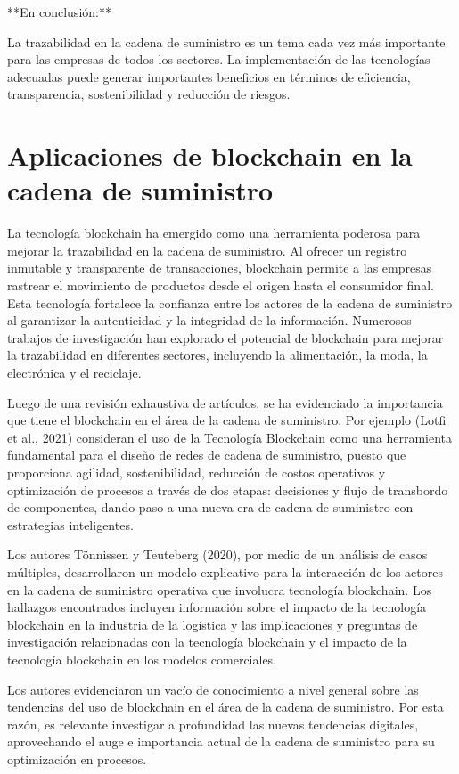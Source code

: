 \documentclass[main.tex]{subfiles}
\begin{document}
**En conclusión:**

La trazabilidad en la cadena de suministro es un tema cada vez más importante para las empresas de todos los sectores. La implementación de las tecnologías adecuadas puede generar importantes beneficios en términos de eficiencia, transparencia, sostenibilidad y reducción de riesgos.

\section{Aplicaciones de blockchain en la cadena de suministro}

La tecnología blockchain ha emergido como una herramienta poderosa para mejorar la trazabilidad en la cadena de suministro. Al ofrecer un registro inmutable y transparente de transacciones, blockchain permite a las empresas rastrear el movimiento de productos desde el origen hasta el consumidor final. Esta tecnología fortalece la confianza entre los actores de la cadena de suministro al garantizar la autenticidad y la integridad de la información. Numerosos trabajos de investigación han explorado el potencial de blockchain para mejorar la trazabilidad en diferentes sectores, incluyendo la alimentación, la moda, la electrónica y el reciclaje.

Luego de una revisión exhaustiva de artículos, se ha evidenciado la importancia que tiene
el blockchain en el área de la cadena de suministro. Por ejemplo (Lotfi et al., 2021) consideran el
uso de la Tecnología Blockchain como una herramienta fundamental para el diseño de redes de
cadena de suministro, puesto que proporciona agilidad, sostenibilidad, reducción de costos
operativos y optimización de procesos a través de dos etapas: decisiones y flujo de transbordo de
componentes, dando paso a una nueva era de cadena de suministro con estrategias inteligentes.

Los autores Tönnissen y Teuteberg (2020), por medio de un análisis de casos múltiples,
desarrollaron un modelo explicativo para la interacción de los actores en la cadena de suministro
operativa que involucra tecnología blockchain. Los hallazgos encontrados incluyen información
sobre el impacto de la tecnología blockchain en la industria de la logística y las implicaciones y
preguntas de investigación relacionadas con la tecnología blockchain y el impacto de la tecnología
blockchain en los modelos comerciales.

Los autores evidenciaron un vacío de conocimiento a nivel general sobre las tendencias del uso de blockchain en el área de la cadena de suministro. Por esta razón, es relevante investigar a profundidad las nuevas tendencias digitales, aprovechando el auge e importancia actual de la cadena de suministro para su optimización en procesos. \cite{torres2022tendencias}
\end{document}

